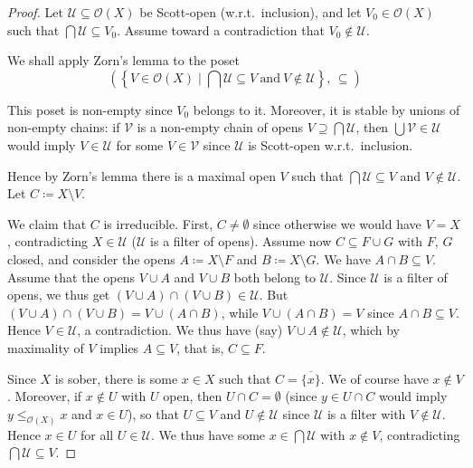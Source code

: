 \documentclass[%
  a4paper,
  UKenglish,
  cleveref,
  autoref,
  thm-restate,
  numberwithinsect,
]{lipics-v2021}
\newcommand\sle\subseteq
\newcommand\sge\supseteq
\newcommand\deq\coloneqq
\newcommand\clos[1]{\overline{#1}}	%
\newcommand\Open{\mathcal{O}}		%
\begin{document}
\begin{proof}
Let $\mathcal{U} \sle \Open(X)$ be Scott-open (w.r.t.\ inclusion),
and let $V_0 \in \Open(X)$ such that $\bigcap \mathcal{U} \sle V_0$.
Assume toward a contradiction that $V_0 \notin \mathcal{U}$.

We shall apply Zorn's lemma to the poset
\[
  \left(
    \left\{ V \in \Open(X)
    \mid
    \bigcap \mathcal{U} \sle V
    ~\text{and}~
    V \notin \mathcal{U}
    \right\}
    ,\,
    \sle
  \right)
\]

\noindent
This poset is non-empty since $V_0$ belongs to it.
Moreover, it is stable by unions of non-empty chains:
if $\mathcal{V}$ is a non-empty chain of opens $V \sge \bigcap \mathcal{U}$,
then $\bigcup \mathcal{V} \in \mathcal{U}$ would imply
$V \in \mathcal{U}$ for some $V \in \mathcal{V}$ since $\mathcal{U}$
is Scott-open w.r.t.\ inclusion.

Hence by Zorn's lemma there is a maximal open $V$
such that $\bigcap \mathcal{U} \sle V$
and $V \notin \mathcal{U}$.
Let $C \deq X \setminus V$.

We claim that $C$ is irreducible.
First, $C \neq \emptyset$
since otherwise we would have $V = X$, contradicting $X \in \mathcal{U}$
($\mathcal{U}$ is a filter of opens).
%
Assume now $C \sle F \cup G$ with $F$, $G$ closed,
and consider the opens $A \deq X \setminus F$
and $B \deq X \setminus G$.
We have $A \cap B \sle V$.
Assume that the opens $V \cup A$ and $V \cup B$ both belong to $\mathcal{U}$.
Since $\mathcal{U}$ is a filter of opens,
we thus get
$(V \cup A) \cap (V \cup B) \in \mathcal{U}$.
But $(V \cup A) \cap (V \cup B) = V \cup (A \cap B)$,
while $V \cup (A \cap B) = V$ since $A \cap B \sle V$.
Hence $V \in \mathcal{U}$, a contradiction.
We thus have (say) $V \cup A \notin \mathcal{U}$,
which by maximality of $V$ implies $A \sle V$,
that is, $C \sle F$.

Since $X$ is sober, there is some $x \in X$
such that $C = \clos{\{x\}}$.
We of course have $x \notin V$.
Moreover, if $x \notin U$ with $U$ open,
then $U \cap C = \emptyset$
(since $y \in U \cap C$ would imply $y \leq_{\Open(X)} x$ and $x \in U$),
so that $U \sle V$
and $U \notin \mathcal{U}$ since $\mathcal{U}$ is a filter with $V \notin \mathcal{U}$.
Hence $x \in U$ for all $U \in \mathcal{U}$.
We thus have some $x \in \bigcap \mathcal{U}$ with $x \notin V$,
contradicting $\bigcap \mathcal{U} \sle V$.
\end{proof}
\end{document}

